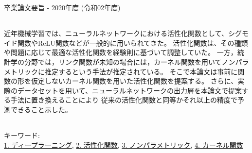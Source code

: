 卒業論文要旨 - 2020年度 (令和02年度)
\begin{center}
\begin{large}
\end{large}
\end{center}

~ \\



近年機械学習では、ニューラルネットワークにおける活性化関数として、シグモイド関数やReLU関数などが一般的に用いられてきた。
活性化関数は、その種類や問題に応じて最適な活性化関数を経験則に基づいて調整していた。
一方，統計学の分野では，リンク関数が未知の場合には，カーネル関数を用いてノンパラメトリックに推定するという手法が推定されている。
そこで本論文は事前に関数の形を仮定しないカーネル関数を用いた活性化関数を提案する。
さらに、実際のデータセットを用いて、ニューラルネットワークの出力層を本論文で提案する手法に置き換えることにより
従来の活性化関数と同等かそれ以上の精度で予測できること示した。


~ \\
キーワード:\\
\underline{1. ディープラーニング},
\underline{2. 活性化関数},
\underline{3. ノンパラメトリック},
\underline{4. カーネル関数}
\begin{flushright}
\dept \\
\author
\end{flushright}

